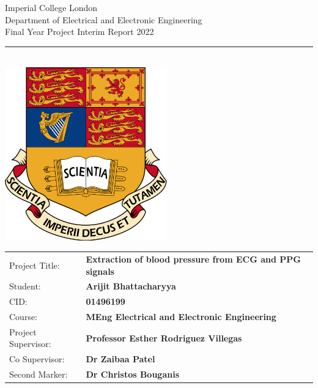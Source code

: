 \documentclass[11pt, a4paper]{article}
\begin{document}
\thispagestyle{empty}

\begin{titlepage}
\setlength{\parindent}{0pt}
\setlength{\parskip}{0pt}
{
    \Large
    \raggedright
    Imperial College London\\[17pt]
    Department of Electrical and Electronic Engineering\\[17pt]
    Final Year Project Interim Report 2022\\[17pt]
}

\rule{\columnwidth}{3pt}
\vfill
    \begin{center}
    \quad\\[1.1cm]
    \includegraphics[width=7cm]{logo.png}\\[1cm]
    \end{center}\vfill
\setlength{\tabcolsep}{0pt}

\begin{tabular}{p{40mm}p{\dimexpr\columnwidth-40mm}}
    Project Title: & \textbf{Extraction of blood pressure from ECG and PPG signals} \\[12pt]
    Student: & \textbf{Arijit Bhattacharyya} \\[12pt]
    CID: & \textbf{01496199} \\[12pt]
    Course: & \textbf{MEng Electrical and Electronic Engineering} \\[12pt]
    Project Supervisor: & \textbf{Professor Esther Rodriguez Villegas} \\[12pt]
    Co Supervisor: & \textbf{Dr Zaibaa Patel} \\[12pt]
    Second Marker: & \textbf{Dr Christos Bouganis} \\[12pt]
\end{tabular}
\end{titlepage}
\end{document}
